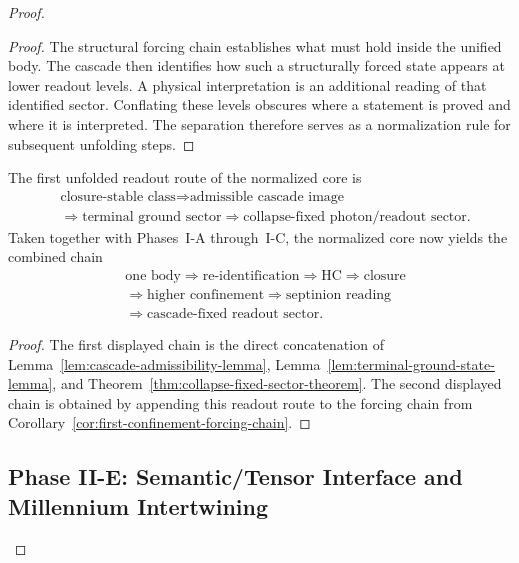 \begin{proof}
\begin{proof}
The structural forcing chain establishes what must hold inside the unified
body. The cascade then identifies how such a structurally forced state appears
at lower readout levels. A physical interpretation is an additional reading of
that identified sector. Conflating these levels obscures where a statement is
proved and where it is interpreted. The separation therefore serves as a
normalization rule for subsequent unfolding steps.
\end{proof}

\begin{corollary}
\label{cor:first-readout-forcing-chain}
The first unfolded readout route of the normalized core is
\[
\begin{aligned}
&\text{closure-stable class} \Longrightarrow \text{admissible cascade image}\\
&\Longrightarrow \text{terminal ground sector} \Longrightarrow \text{collapse-fixed photon/readout sector}.
\end{aligned}
\]
Taken together with Phases~I-A through~I-C, the normalized core now yields the
combined chain
\[
\begin{aligned}
&\text{one body} \Longrightarrow \text{re-identification} \Longrightarrow \mathrm{HC} \Longrightarrow \text{closure}\\
&\Longrightarrow \text{higher confinement} \Longrightarrow \text{septinion reading}\\
&\Longrightarrow \text{cascade-fixed readout sector}.
\end{aligned}
\]
\end{corollary}

\begin{proof}
The first displayed chain is the direct concatenation of
Lemma~\ref{lem:cascade-admissibility-lemma},
Lemma~\ref{lem:terminal-ground-state-lemma}, and
Theorem~\ref{thm:collapse-fixed-sector-theorem}. The second displayed chain is
obtained by appending this readout route to the forcing chain from
Corollary~\ref{cor:first-confinement-forcing-chain}.
\end{proof}


\subsection*{Phase II-E: Semantic/Tensor Interface and Millennium Intertwining}


\end{proof}
